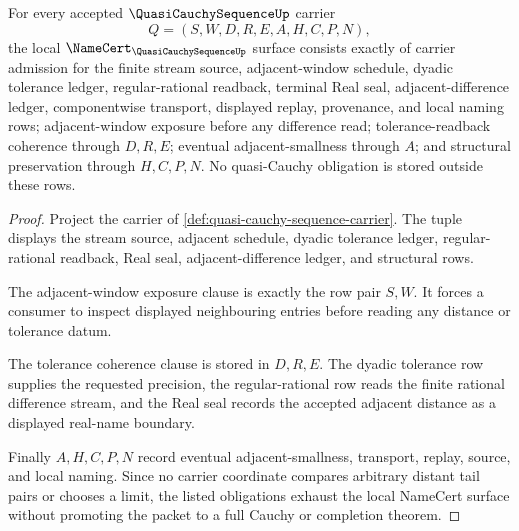\begin{theorem}
\label{thm:quasi-cauchy-sequence-namecert-obligations}
For every accepted $\QuasiCauchySequenceUp$ carrier
$$
Q=(S,W,D,R,E,A,H,C,P,N),
$$
the local $\NameCert_{\QuasiCauchySequenceUp}$ surface consists exactly of carrier admission for the finite stream source, adjacent-window schedule, dyadic tolerance ledger, regular-rational readback, terminal Real seal, adjacent-difference ledger, componentwise transport, displayed replay, provenance, and local naming rows; adjacent-window exposure before any difference read; tolerance-readback coherence through $D,R,E$; eventual adjacent-smallness through $A$; and structural preservation through $H,C,P,N$. No quasi-Cauchy obligation is stored outside these rows.
\end{theorem}
\begin{proof}
Project the carrier of \autoref{def:quasi-cauchy-sequence-carrier}. The tuple displays the stream source, adjacent schedule, dyadic tolerance ledger, regular-rational readback, Real seal, adjacent-difference ledger, and structural rows.

The adjacent-window exposure clause is exactly the row pair $S,W$. It forces a consumer to inspect displayed neighbouring entries before reading any distance or tolerance datum.

The tolerance coherence clause is stored in $D,R,E$. The dyadic tolerance row supplies the requested precision, the regular-rational row reads the finite rational difference stream, and the Real seal records the accepted adjacent distance as a displayed real-name boundary.

Finally $A,H,C,P,N$ record eventual adjacent-smallness, transport, replay, source, and local naming. Since no carrier coordinate compares arbitrary distant tail pairs or chooses a limit, the listed obligations exhaust the local NameCert surface without promoting the packet to a full Cauchy or completion theorem.
\end{proof}

